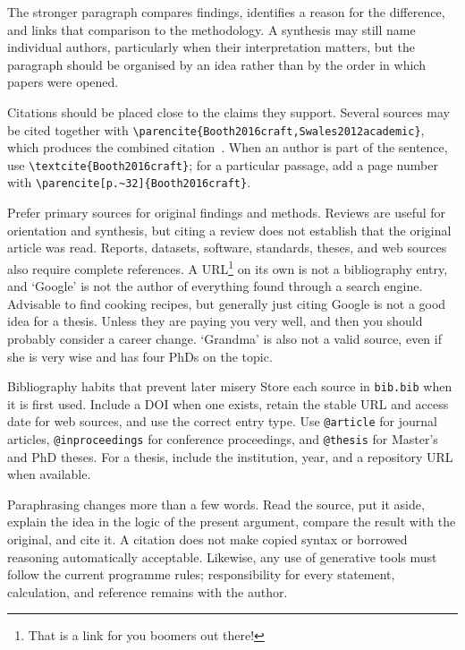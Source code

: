 \documentclass[masters,en,listoffigures,listoftables,acronyms]{NMBU}
\begin{document}
The stronger paragraph compares findings, identifies a reason for the
difference, and links that comparison to the methodology. A synthesis may still
name individual authors, particularly when their interpretation matters, but
the paragraph should be organised by an idea rather than by the order in which
papers were opened.

Citations should be placed close to the claims they support. Several sources
may be cited together with
\verb|\parencite{Booth2016craft,Swales2012academic}|, which produces the combined
citation~\parencite{Booth2016craft,Swales2012academic}. When an author is part of
the sentence, use \verb|\textcite{Booth2016craft}|; for a particular passage,
add a page number with \verb|\parencite[p.~32]{Booth2016craft}|.

Prefer primary sources for original findings and methods.
Reviews are useful for orientation and synthesis, but citing a review does not establish that the original article was read.
Reports, datasets, software, standards, theses, and web sources also require complete references.
A URL\footnote{That is a link for you boomers out there!} on its own is not a bibliography entry, and `Google' is not the author of everything found through a search engine.
Advisable to find cooking recipes, but generally just citing Google is not a good idea for a thesis.
Unless they are paying you very well, and then you should probably consider a career change.
`Grandma' is also not a valid source, even if she is very wise and has four PhDs on the topic.

\begin{latexnote}{Bibliography habits that prevent later misery}
Store each source in \texttt{bib.bib} when it is first used. Include a DOI when
one exists, retain the stable URL and access date for web sources, and use the
correct entry type. Use \texttt{@article} for journal articles,
\texttt{@inproceedings} for conference proceedings, and \texttt{@thesis} for
Master's and PhD theses. For a thesis, include the institution, year, and a
repository URL when available.
\end{latexnote}

Paraphrasing changes more than a few words. Read the source, put it aside,
explain the idea in the logic of the present argument, compare the result with
the original, and cite it. A citation does not make copied syntax or borrowed
reasoning automatically acceptable. Likewise, any use of generative tools must
follow the current programme rules; responsibility for every statement,
calculation, and reference remains with the author.
\end{document}
